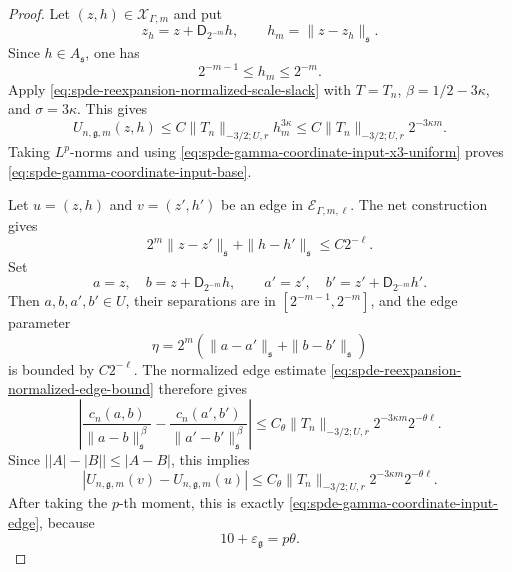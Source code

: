 \begin{proof}
Let \((z,h)\in\mathcal X_{\Gamma,m}\) and put
\[
  z_h=z+\mathsf D_{2^{-m}}h,
  \qquad
  h_m=\|z-z_h\|_{\mathfrak s}.
\]
Since \(h\in A_{\mathfrak s}\), one has
\begin{equation}
  2^{-m-1}\leq h_m\leq 2^{-m}.
  \label{eq:spde-gamma-coordinate-input-annular-scale}
\end{equation}
Apply
\eqref{eq:spde-reexpansion-normalized-scale-slack} with
\(T=T_n\), \(\beta=1/2-3\kappa\), and \(\sigma=3\kappa\).  This gives
\begin{equation}
  U_{n,\mathfrak g,m}(z,h)
  \leq
  C\|T_n\|_{-3/2;U,r}h_m^{3\kappa}
  \leq
  C\|T_n\|_{-3/2;U,r}2^{-3\kappa m}.
  \label{eq:spde-gamma-coordinate-input-pointwise-base}
\end{equation}
Taking \(L^p\)-norms and using
\eqref{eq:spde-gamma-coordinate-input-x3-uniform} proves
\eqref{eq:spde-gamma-coordinate-input-base}.

Let \(u=(z,h)\) and \(v=(z',h')\) be an edge in
\(\mathcal E_{\Gamma,m,\ell}\).  The net construction gives
\begin{equation}
  2^m\|z-z'\|_{\mathfrak s}+\|h-h'\|_{\mathfrak s}
  \leq
  C2^{-\ell}.
  \label{eq:spde-gamma-coordinate-input-edge-distance}
\end{equation}
Set
\[
  a=z,\quad b=z+\mathsf D_{2^{-m}}h,\qquad
  a'=z',\quad b'=z'+\mathsf D_{2^{-m}}h' .
\]
Then \(a,b,a',b'\in U\), their separations are in
\([2^{-m-1},2^{-m}]\), and the edge parameter
\[
  \eta=
  2^m(\|a-a'\|_{\mathfrak s}+\|b-b'\|_{\mathfrak s})
\]
is bounded by \(C2^{-\ell}\).  The normalized edge estimate
\eqref{eq:spde-reexpansion-normalized-edge-bound} therefore gives
\[
  \left|
    \frac{c_n(a,b)}{\|a-b\|_{\mathfrak s}^{\,\beta}}
    -
    \frac{c_n(a',b')}{\|a'-b'\|_{\mathfrak s}^{\,\beta}}
  \right|
  \leq
  C_\theta\|T_n\|_{-3/2;U,r}2^{-3\kappa m}2^{-\theta\ell}.
\]
Since \(\bigl||A|-|B|\bigr|\leq |A-B|\), this implies
\begin{equation}
  |U_{n,\mathfrak g,m}(v)-U_{n,\mathfrak g,m}(u)|
  \leq
  C_\theta\|T_n\|_{-3/2;U,r}2^{-3\kappa m}2^{-\theta\ell}.
  \label{eq:spde-gamma-coordinate-input-pointwise-edge}
\end{equation}
After taking the \(p\)-th moment, this is exactly
\eqref{eq:spde-gamma-coordinate-input-edge}, because
\[
  10+\varepsilon_{\mathfrak g}=p\theta .
\]


\end{proof}
